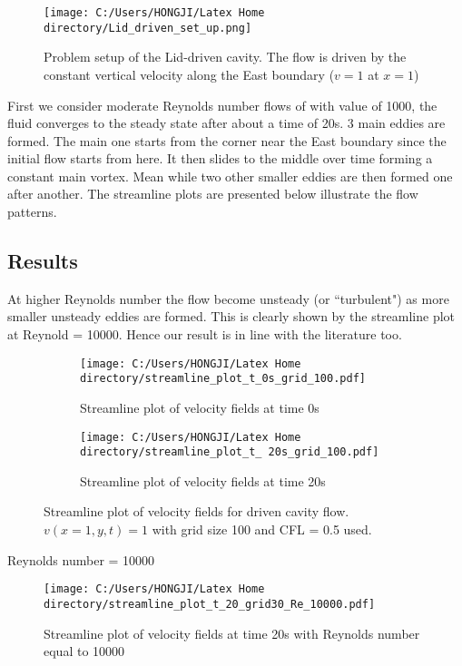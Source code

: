 \begin{figure}[H]
	\centering
	\texttt{[image: C:/Users/HONGJI/Latex Home directory/Lid\_driven\_set\_up.png]}
	\caption{Problem setup of the Lid-driven cavity. The flow is driven by the constant vertical velocity along the East boundary ($v=1$ at $x=1$)  }	
\label{fig:6.16}
\end{figure}
First we consider moderate Reynolds number flows of with value of 1000, the fluid converges to the steady state after about a time of 20s. 3 main eddies are formed. The main one starts from the corner near the East boundary since the initial flow starts from here. It then slides to the middle over time forming a constant main vortex. Mean while two other smaller eddies are then formed one after another. The streamline plots are presented below illustrate the flow patterns.\\

\subsection{Results}
At higher Reynolds number the flow become unsteady (or ``turbulent") as more smaller unsteady eddies are formed. This is clearly shown by the streamline plot at Reynold = 10000. Hence our result is in line with the literature too.\\

\begin{figure}[H]
	\centering
	\begin{subfigure}[t]{2.5in}
		\centering
		\texttt{[image: C:/Users/HONGJI/Latex Home directory/streamline\_plot\_t\_0s\_grid\_100.pdf]}
		\caption{Streamline plot of velocity fields at time 0s}\label{fig:6.19a}		
	\end{subfigure}
	\quad
	\begin{subfigure}[t]{2.5in}
		\centering
		\texttt{[image: C:/Users/HONGJI/Latex Home directory/streamline\_plot\_t\_ 20s\_grid\_100.pdf]}
		\caption{Streamline plot of velocity fields at time 20s}\label{fig:6.19b}
	\end{subfigure}
	\caption{Streamline plot of velocity fields for driven cavity flow. $v(x=1,y,t) = 1$ with grid size 100 and CFL = 0.5 used.}\label{fig:6.16}
\end{figure}

Reynolds number = 10000
\begin{figure}[H]
	\centering
	\texttt{[image: C:/Users/HONGJI/Latex Home directory/streamline\_plot\_t\_20\_grid30\_Re\_10000.pdf]}
	\caption{Streamline plot of velocity fields at time 20s with Reynolds number equal to 10000}\label{fig:6.19}		
\label{fig:6.16}
\end{figure}

